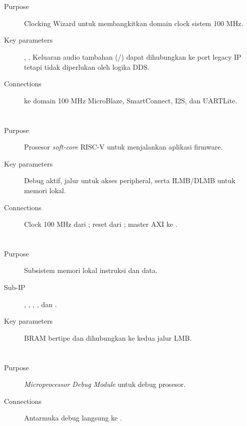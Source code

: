 \section*{}
\begin{description}
    \item[Purpose] Clocking Wizard untuk membangkitkan domain clock sistem 100 MHz.
    \item[Key parameters] , . Keluaran audio tambahan (/) dapat dihubungkan ke port legacy IP tetapi tidak diperlukan oleh logika DDS.
    \item[Connections]  ke domain 100 MHz MicroBlaze, SmartConnect, I2S, dan UARTLite.
\end{description}

\section*{}
\begin{description}
    \item[Purpose] Prosesor \textit{soft-core} RISC-V untuk menjalankan aplikasi firmware.
    \item[Key parameters] Debug aktif, jalur  untuk akses peripheral, serta ILMB/DLMB untuk memori lokal.
    \item[Connections] Clock 100 MHz dari ; reset dari ; master AXI ke .
\end{description}

\section*{}
\begin{description}
    \item[Purpose] Subsistem memori lokal instruksi dan data.
    \item[Sub-IP] , , , , dan .
    \item[Key parameters] BRAM bertipe  dan dihubungkan ke kedua jalur LMB.
\end{description}

\section*{}
\begin{description}
    \item[Purpose] \textit{Microprocessor Debug Module} untuk debug prosesor.
    \item[Connections] Antarmuka debug langsung ke .
\end{description}

